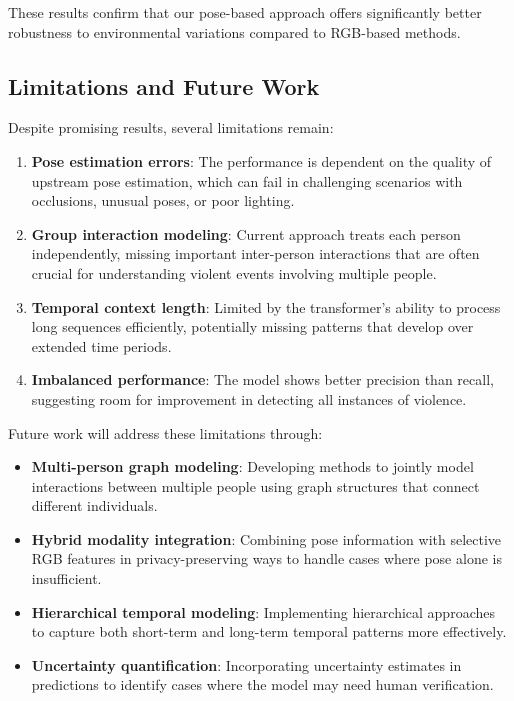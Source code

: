 \documentclass[conference]{IEEEtran}
\begin{document}
These results confirm that our pose-based approach offers significantly better robustness to environmental variations compared to RGB-based methods.

\subsection{Limitations and Future Work}
Despite promising results, several limitations remain:

\begin{enumerate}
    \item \textbf{Pose estimation errors}: The performance is dependent on the quality of upstream pose estimation, which can fail in challenging scenarios with occlusions, unusual poses, or poor lighting.

    \item \textbf{Group interaction modeling}: Current approach treats each person independently, missing important inter-person interactions that are often crucial for understanding violent events involving multiple people.

    \item \textbf{Temporal context length}: Limited by the transformer's ability to process long sequences efficiently, potentially missing patterns that develop over extended time periods.

    \item \textbf{Imbalanced performance}: The model shows better precision than recall, suggesting room for improvement in detecting all instances of violence.
\end{enumerate}

Future work will address these limitations through:

\begin{itemize}
    \item \textbf{Multi-person graph modeling}: Developing methods to jointly model interactions between multiple people using graph structures that connect different individuals.

    \item \textbf{Hybrid modality integration}: Combining pose information with selective RGB features in privacy-preserving ways to handle cases where pose alone is insufficient.

    \item \textbf{Hierarchical temporal modeling}: Implementing hierarchical approaches to capture both short-term and long-term temporal patterns more effectively.

    \item \textbf{Uncertainty quantification}: Incorporating uncertainty estimates in predictions to identify cases where the model may need human verification.
\end{itemize}
\end{document}
